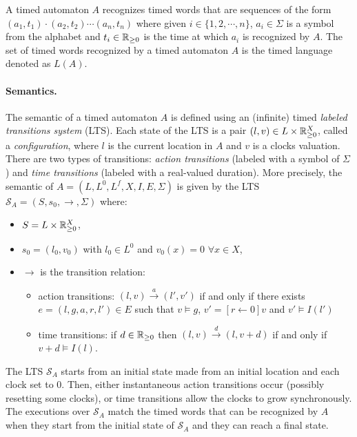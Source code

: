 A timed automaton $A$ recognizes timed words that are sequences of the form $(a_1, t_1) \cdot (a_2, t_2) \cdots (a_n, t_n)$ where given $i \in \{1, 2, \cdots, n\}$, $a_i \in \Sigma$ is a symbol from the alphabet and $t_i \in \mathbb{R}_{\geq 0}$ is the time at which $a_i$ is recognized by $A$. The set of timed words recognized by a timed automaton $A$ is the timed language denoted as $L(A)$.

\paragraph{Semantics.}
The semantic of a timed automaton $A$ is defined using an (infinite) timed \emph{labeled transitions system} (LTS). Each state of the LTS is a pair $(l, v) \in L \times \mathbb{R}_{\geq 0}^X$, called a \emph{configuration}, where $l$ is the current location in $A$ and $v$ is a clocks valuation. There are two types of transitions: \emph{action transitions} (labeled with a symbol of $\Sigma$) and \emph{time transitions} (labeled with a real-valued duration). More precisely, the semantic of $A = (L, L^0, L^f, X, I, E, \Sigma)$ is given by the LTS $\mathcal{S}_A = (S, s_0, \rightarrow, \Sigma)$ where:

\begin{itemize}

    \item $S = L \times \mathbb{R}_{\geq 0}^X$,

    \item $s_0 = (l_0, v_0)$ with $l_0 \in L^0$ and $v_0(x) = 0$ $\forall x \in X$,

    \item $\rightarrow$ is the transition relation:
    \begin{itemize}

        \item action transitions: $(l, v) \stackrel{a}{\longrightarrow} (l', v')$ if and only if there exists
        $e = (l, g, a, r, l') \in E$ such that $v \models g$, $v' = [r \leftarrow 0]v$ and $v' \models I(l')$

        \item time transitions: if $d \in \mathbb{R}_{\geq 0}$ then $(l, v) \stackrel{d}{\longrightarrow} (l, v + d)$ if and only if $v + d \models I(l)$.

    \end{itemize}

\end{itemize}

The LTS $\mathcal{S}_A$ starts from an initial state made from an initial location and each clock set to $0$. Then, either instantaneous action transitions occur (possibly resetting some clocks), or time transitions allow the clocks to grow synchronously. The executions over $\mathcal{S}_A$ match the timed words that can be recognized by $A$ when they start from the initial state of $\mathcal{S}_A$ and they can reach a final state.\\

